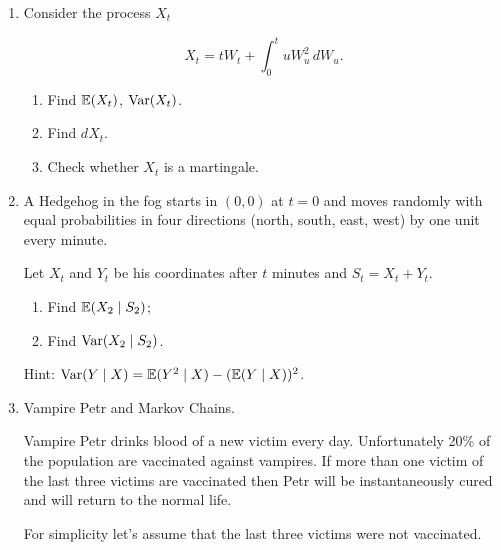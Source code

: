 \begin{enumerate}
\begin{tabular}{cccc}
\toprule
$x$ & $-1$ & $0$ & $1$ \\
$\P(X_t = x)$ & $0.2$ & $0.2$ & $0.6$ \\
\bottomrule
\end{tabular}

\begin{enumerate}
    \item If possible find all constants $a$ such that $M_t = S_t + at$ is a martingale.
  \item If possible find all constants $b$ such that $R_t = b^{S_t}$ is a martingale.
\end{enumerate}

\item Consider the process $X_t$

\[
X_t= tW_t + \int_0^t uW_u^2\, dW_u.
\]

\begin{enumerate}
    \item Find $\operatorname{\mathbb{E}}(X_t)$, $\operatorname{Var}(X_t)$.
    \item Find $dX_t$.
    \item Check whether $X_t$ is a martingale.
\end{enumerate}

\item A Hedgehog in the fog starts in $(0, 0)$ at $t=0$ and moves randomly with equal probabilities in four directions (north, south, east, west) by one unit every minute. 

Let $X_t$ and $Y_t$ be his coordinates after $t$ minutes and $S_t = X_t + Y_t$.

\begin{enumerate}
    \item Find $\operatorname{\mathbb{E}}(X_2 \mid S_2)$;
    \item Find $\operatorname{Var}(X_2 \mid S_2)$.
\end{enumerate}

Hint: $\operatorname{Var}(Y \mid X) = \operatorname{\mathbb{E}}(Y^2 \mid X) - (\operatorname{\mathbb{E}}(Y \mid X))^2$.

    \item Vampire Petr and Markov Chains. 
    
    Vampire Petr drinks blood of a new victim every day. 
    Unfortunately 20\% of the population are vaccinated against vampires. 
    If more than one victim of the last three victims are vaccinated then Petr will be instantaneously cured and will return to the normal life. 
 
    For simplicity let's assume that the last three victims were not vaccinated. 
    

\end{enumerate}
